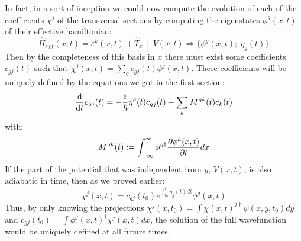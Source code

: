 \documentclass[11pt, a4paper]{article} %
\begin{document}
In fact, in a sort of inception we could now compute the evolution of each of the coefficients $\chi^j$ of the transversal sections by computing the eigenstates $\phi^g(x,t)$ of their effective hamiltonian:
\begin{equation}
\hat{H}_{eff}(x,t)= \varepsilon^k(x,t) + \hat{T}_x+V(x,t) \Rightarrow \{\phi^g(x,t);\ \eta_g(t)\}
\end{equation}
Then by the completeness of this basis in $x$ there must exist some coefficients $c_{gj}(t)$ such that $\chi^j(x,t)=\sum_g c_{gj}(t) \phi^g(x,t)$. These coefficients will be uniquely defined by the equations we got in the first section:
\begin{equation} 
\dv{}{t}c_{gj}(t)=-\frac{i}{\hbar}\eta^g(t) c_{gj}(t) + \sum_k M^{gk}(t)c_k(t)
\end{equation}
with:
\begin{equation}
M^{gk}(t):=\int_{-\infty}^\infty\phi^{g \dagger} \pdv{\phi^k(x,t)}{t} dx
\end{equation}
If the part of the potential that was independent from $y$, $V(x,t)$, is also adiabatic in time, then as we proved earlier:
\begin{equation}
\chi^j(x,t)=c_{gj}(t_0)e^{\int_{t_0}^t \eta_g(t) dt} \phi^g(x,t)
\end{equation}
Thus, by only knowing the projections $\chi^j(x,t_0)=\int \chi(x,t)^{j\dagger} \psi(x,y,t_0)dy$ and $c_{gj}(t_0)=\int \phi^g(x,t)^\dagger \chi^j(x,t)dx$, the solution of the full wavefunction would be uniquely defined at all future times.
\end{document}
